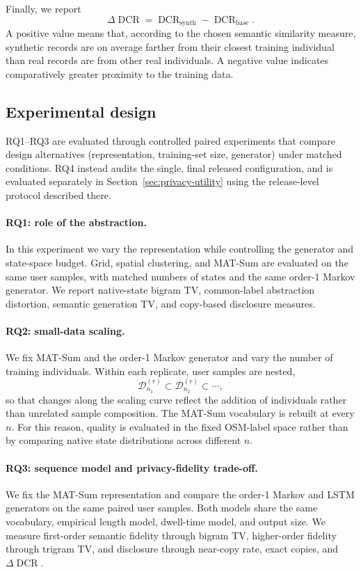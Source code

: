 \documentclass[sigconf,nonacm]{acmart}
\begin{document}
Finally, we report
%
\[
    \Delta\operatorname{DCR}
    =
    \operatorname{DCR}_{\mathrm{synth}}
    -
    \operatorname{DCR}_{\mathrm{base}}.
\]
%
A positive value means that, according to the chosen semantic similarity measure, synthetic records are on average farther from their closest training individual than real records are from other real individuals. A negative value indicates comparatively greater proximity to the training data.

\subsection{Experimental design}
\label{sec:experimental-design}

RQ1--RQ3 are evaluated through controlled paired experiments that compare design alternatives (representation, training-set size, generator) under matched conditions. RQ4 instead audits the single, final released configuration, and is evaluated separately in Section~\ref{sec:privacy-utility} using the release-level protocol described there.

\paragraph{RQ1: role of the abstraction.}
In this experiment we vary the representation while controlling the generator and state-space budget. Grid, spatial clustering, and MAT-Sum are evaluated on the same user samples, with matched numbers of states and the same order-1 Markov generator. We report native-state bigram TV, common-label abstraction distortion, semantic generation TV, and copy-based disclosure measures.

\paragraph{RQ2: small-data scaling.}
We fix MAT-Sum and the order-1 Markov generator and vary the number of training individuals. Within each replicate, user samples are nested,
%
\[
    \mathcal{D}_{n_1}^{(r)}
    \subset
    \mathcal{D}_{n_2}^{(r)}
    \subset \cdots,
\]
%
so that changes along the scaling curve reflect the addition of individuals rather than unrelated sample composition. The MAT-Sum vocabulary is rebuilt at every $n$. For this reason, quality is evaluated in the fixed OSM-label space rather than by comparing native state distributions across different $n$.

\paragraph{RQ3: sequence model and privacy-fidelity trade-off.}
We fix the MAT-Sum representation and compare the order-1 Markov and LSTM generators on the same paired user samples. Both models share the same vocabulary, empirical length model, dwell-time model, and output size. We measure first-order semantic fidelity through bigram TV, higher-order fidelity through trigram TV, and disclosure through near-copy rate, exact copies, and $\Delta\operatorname{DCR}$.
\end{document}
